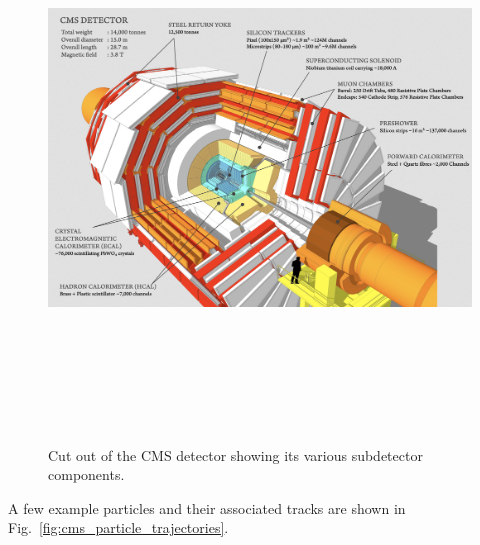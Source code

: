 \begin{figure}[pbth]
\centering
\includegraphics[width=15cm,height=15cm,keepaspectratio]{figures/cms/CMS_cut_away.png}
    \caption{Cut out of the CMS detector showing its various subdetector components.} 
    \label{fig:cms_cut_out_view}
\end{figure}
A few example particles and their associated tracks are shown in Fig.~\ref{fig:cms_particle_trajectories}.

